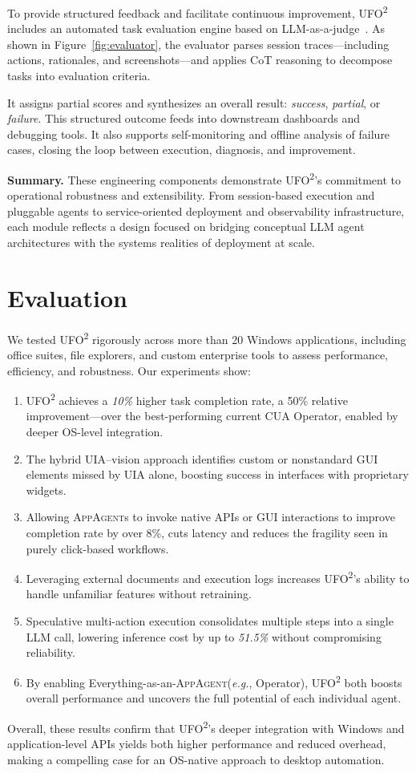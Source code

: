 \documentclass[sigplan,10pt]{acmart}
\newcommand{\name}{\textsc{UFO}\textsuperscript{2}\xspace}
\newcommand{\appa}{\textsc{AppAgent}\xspace}
\newcommand{\appas}{\textsc{AppAgent}s\xspace}
\newcommand{\eg}{\textit{e.g.},\xspace}
\begin{document}
To provide structured feedback and facilitate continuous improvement, \name includes an automated task evaluation engine based on LLM-as-a-judge~\cite{chen2024mllm}. As shown in Figure~\ref{fig:evaluator}, the evaluator parses session traces—including actions, rationales, and screenshots—and applies CoT reasoning to decompose tasks into evaluation criteria.

It assigns partial scores and synthesizes an overall result: \emph{success}, \emph{partial}, or \emph{failure}. This structured outcome feeds into downstream dashboards and debugging tools. It also supports self-monitoring and offline analysis of failure cases, closing the loop between execution, diagnosis, and improvement.

\vspace{0.5em}
\noindent
\textbf{Summary.} These engineering components demonstrate \name's commitment to operational robustness and extensibility. From session-based execution and pluggable agents to service-oriented deployment and observability infrastructure, each module reflects a design focused on bridging conceptual LLM agent architectures with the systems realities of deployment at scale.


\section{Evaluation} 
We tested \name rigorously across more than 20 Windows applications, including office suites, file explorers, and custom enterprise tools to assess performance, efficiency, and robustness. Our experiments show:
\begin{enumerate} 
    \item \name achieves a \textit{10\%} higher task completion rate, a 50\% relative improvement—over the best-performing current CUA Operator, enabled by deeper OS-level integration.
    \item The hybrid UIA--vision approach identifies custom or nonstandard GUI elements missed by UIA alone, boosting success in interfaces with proprietary widgets. 
    \item Allowing \appas to invoke native APIs or GUI interactions to improve completion rate by over 8\%, cuts latency and reduces the fragility seen in purely click-based workflows. 
    \item Leveraging external documents and execution logs increases \name's ability to handle unfamiliar features without retraining. 
    \item Speculative multi-action execution consolidates multiple steps into a single LLM call, lowering inference cost by up to \textit{51.5\%} without compromising reliability. 
    \item  By enabling Everything-as-an-\appa (\eg Operator), \name both boosts overall performance and uncovers the full potential of each individual agent.
\end{enumerate}
Overall, these results confirm that \name's deeper integration with Windows and application-level APIs yields both higher performance and reduced overhead, making a compelling case for an OS-native approach to desktop automation.
\end{document}
